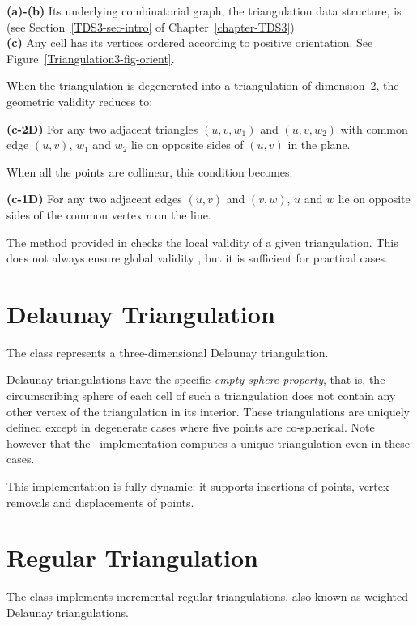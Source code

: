 {\bf (a)-(b)} Its underlying combinatorial graph, the triangulation
data structure, is  
(see Section~\ref{TDS3-sec-intro} of Chapter~\ref{chapter-TDS3})\\
{\bf (c)} Any cell has its vertices ordered according to positive
orientation. See Figure~\ref{Triangulation3-fig-orient}.

When the triangulation is degenerated into a triangulation of
dimension~2, the  geometric validity reduces to:

{\bf (c-2D)} For any two adjacent triangles $(u,v,w_1)$ and $(u,v,w_2)$ with
common edge $(u,v)$, $w_1$ and $w_2$ lie on opposite sides of $(u,v)$
in the plane.

When all the points are collinear, this condition becomes:

{\bf (c-1D)} For any two adjacent edges $(u,v)$ and $(v,w)$, $u$ and
$w$ lie on opposite sides of the common vertex $v$ on the line.

The  method provided in  checks
the local validity of a given triangulation. This does not always
ensure global validity \cite{mnssssu-cgpvg-96}, \cite{dlpt-ccpps-98} but it is 
sufficient for practical cases.


\section{Delaunay Triangulation} 

The class  represents a three-dimensional
Delaunay triangulation.

Delaunay triangulations have the specific \textit{empty sphere property},
that is, the circumscribing sphere of each cell of such a triangulation
does not contain any other vertex of the triangulation in its interior.
These triangulations are uniquely defined except in degenerate cases
where five points are co-spherical.  Note however that the \cgal\ implementation
computes a unique triangulation even in these cases.

This implementation is fully dynamic: it supports insertions of points, vertex removals
and displacements of points.


\section{Regular Triangulation\label{Triangulation3-sec-class-Regulartriangulation}}

The class  implements incremental regular
triangulations, also known as weighted Delaunay triangulations.

